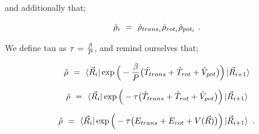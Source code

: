 \documentclass{article}
\begin{document}
and additionally that;

\begin{equation} \label{eq:1}
\hat{\rho}_i \hspace{0.125cm} = \hspace{0.125cm} \hat{\rho}_{trans_i} \hat{\rho}_{rot_i} \hat{\rho}_{pot_i} \hspace{0.125cm} .
\end{equation}

We define tau as \begin{math} \tau \hspace{0.025cm} = \hspace{0.025cm} \frac{\beta}{P} \end{math}, and remind ourselves that;

\begin{equation} \label{eq:1}
\hat{\rho} \hspace{0.125cm} = \hspace{0.125cm} \bra{\vec{R}_i} \exp \Big( - \frac{\beta}{P} \big( \hat{T}_{trans} + \hat{T}_{rot} + \hat{V}_{pot} \big) \Big) \ket{\vec{R}_{i+1}}
\end{equation}

\begin{equation} \label{eq:1}
\hat{\rho} \hspace{0.125cm} = \hspace{0.125cm} \bra{\vec{R}_i} \exp \Big( - \tau \big( \hat{T}_{trans} + \hat{T}_{rot} + \hat{V}_{pot} \big) \Big) \ket{\vec{R}_{i+1}}
\end{equation}

\begin{equation} \label{eq:1}
\hat{\rho} \hspace{0.125cm} = \hspace{0.125cm} \bra{\vec{R}_i} \exp \Big( - \tau \big( E_{trans} + E_{rot} + V(\vec{R})\big) \Big) \ket{\vec{R}_{i+1}} \hspace{0.125cm} .
\end{equation}
\end{document}
